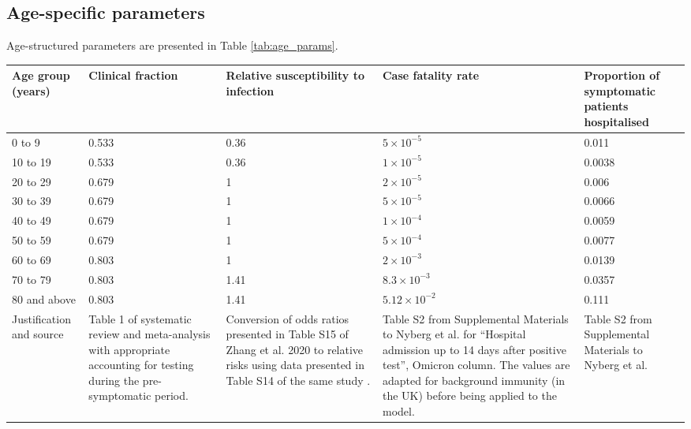 \subsection{Age-specific parameters}
Age-structured parameters are presented in Table \ref{tab:age_params}.

\begin{table}
    \begin{threeparttable}
    \begin{tabularx}{\textwidth}{| X | X | X | X | X |}
        \hline
        \textbf{Age group} (years) & \textbf{Clinical fraction} \tnote{a} & 
        \textbf{Relative susceptibility to infection} & \textbf{Case fatality rate} & 
        \textbf{Proportion of symptomatic patients hospitalised} \\
        \hline
        0 to 9   & 0.533 & 0.36 & $5\times10^{-5}$   & 0.011 \\
        \hline
        10 to 19 & 0.533 & 0.36 & $1\times10^{-5}$   & 0.0038 \\
        \hline
        20 to 29 & 0.679 & 1    & $2\times10^{-5}$   & 0.006 \\
        \hline
        30 to 39 & 0.679 & 1    & $5\times10^{-5}$   & 0.0066 \\
        \hline
        40 to 49 & 0.679 & 1    & $1\times10^{-4}$   & 0.0059 \\
        \hline
        50 to 59 & 0.679 & 1    & $5\times10^{-4}$   & 0.0077 \\
        \hline
        60 to 69 & 0.803 & 1    & $2\times10^{-3}$   & 0.0139 \\
        \hline
        70 to 79 & 0.803 & 1.41 & $8.3\times10^{-3}$ \tnote{b} & 0.0357 \tnote{b} \\
        \hline
        80 and above & 0.803 & 1.41 & $5.12\times10^{-2}$ \tnote{b} & 0.111 \tnote{b} \\
        \hline
        Justification and source & 
        Table 1 of systematic review and meta-analysis 
        with appropriate accounting for testing during the pre-symptomatic period\cite{sah-2021}. & 
        Conversion of odds ratios presented in Table S15 
        of Zhang et al. 2020 to relative risks 
        using data presented in Table S14 of the same study \cite{zhang-2020-a}. &
        Table S2 from Supplemental Materials to Nyberg et al. 
        for ``Hospital admission up to 14 days after positive test'', Omicron column.
        The values are adapted for background immunity (in the UK) before being applied to the
        model. &
        Table S2 from Supplemental Materials to Nyberg et al. 

\end{tabularx}
\end{threeparttable}
\end{table}
